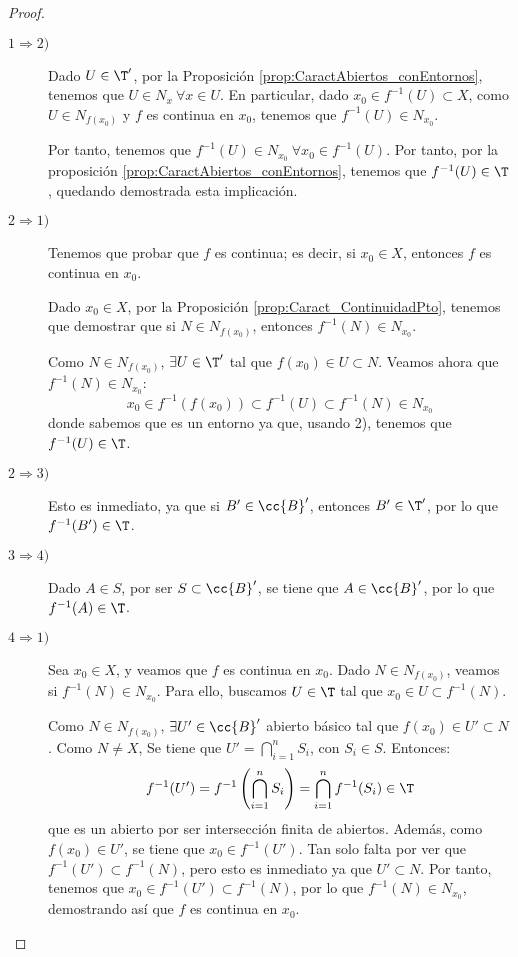 \begin{proof}\
    \begin{description}
        \item[$1\Longrightarrow 2)$] Dado $U\in \T'$, por la Proposición \ref{prop:CaractAbiertos_conEntornos}, tenemos que $U\in N_x~\forall x\in U$. En particular, dado $x_0\in f^{-1}(U)\subset X$, como $U\in N_{f(x_0)}$ y $f$ es continua en $x_0$, tenemos que $f^{-1}(U)\in N_{x_0}$.

        Por tanto, tenemos que $f^{-1}(U)\in N_{x_0}~\forall x_0\in f^{-1}(U)$. Por tanto, por la proposición \ref{prop:CaractAbiertos_conEntornos}, tenemos que $f^{-1}(U)\in \T$, quedando demostrada esta implicación.

        \item[$2\Longrightarrow 1)$] Tenemos que probar que $f$ es continua; es decir, si $x_0\in X$, entonces $f$ es continua en $x_0$.

        Dado $x_0\in X$, por la Proposición \ref{prop:Caract_ContinuidadPto}, tenemos que demostrar que si $N\in N_{f(x_0)}$, entonces $f^{-1}(N)\in N_{x_0}$.

        Como $N\in N_{f(x_0)}$, $\exists U\in \T'$ tal que $f(x_0)\in U\subset N$. Veamos ahora que $f^{-1}(N)\in N_{x_0}$:
        \begin{equation*}
            x_0\in f^{-1}(f(x_0))\subset f^{-1}(U)\subset f^{-1}(N) \in N_{x_0}
        \end{equation*}
        donde sabemos que es un entorno ya que, usando 2), tenemos que $f^{-1}(U)\in \T$. 


        \item[$2\Longrightarrow 3)$] Esto es inmediato, ya que si $B'\in \cc{B}'$, entonces $B'\in \T'$, por lo que $f^{-1}(B')\in \T$.
        \item[$3\Longrightarrow 4)$] Dado $A\in S$, por ser $S\subset \cc{B}'$, se tiene que
        $A\in \cc{B}'$, por lo que $f^{-1}(A)\in \T$.
        \item[$4\Longrightarrow 1)$] Sea $x_0\in X$, y veamos que $f$ es continua en $x_0$. Dado $N\in N_{f(x_0)}$,
        veamos si $f^{-1}(N)\in N_{x_0}$. Para ello, buscamos $U\in \T$ tal que $x_0\in U\subset f^{-1}(N)$.

        Como $N\in N_{f(x_0)}$, $\exists U'\in \cc{B}'$ abierto básico tal que $f(x_0)\in U'\subset N$.
        Como $N\neq X$, Se tiene que $U'=\bigcap_{i=1}^n S_i$, con $S_i\in S$. Entonces:
        \begin{equation*}
            f^{-1}(U')=f^{-1}\left(\bigcap_{i=1}^n S_i\right)=\bigcap_{i=1}^n f^{-1}(S_i)\in \T
        \end{equation*}
        que es un abierto por ser intersección finita de abiertos. Además, como $f(x_0)\in U'$, se tiene que $x_0\in f^{-1}(U')$.
        Tan solo falta por ver que $f^{-1}(U')\subset f^{-1}(N)$, pero esto es inmediato ya que $U'\subset N$.
        Por tanto, tenemos que $x_0\in f^{-1}(U')\subset f^{-1}(N)$, por lo que $f^{-1}(N)\in N_{x_0}$, demostrando así que $f$ es continua en $x_0$.


\end{description}
\end{proof}
